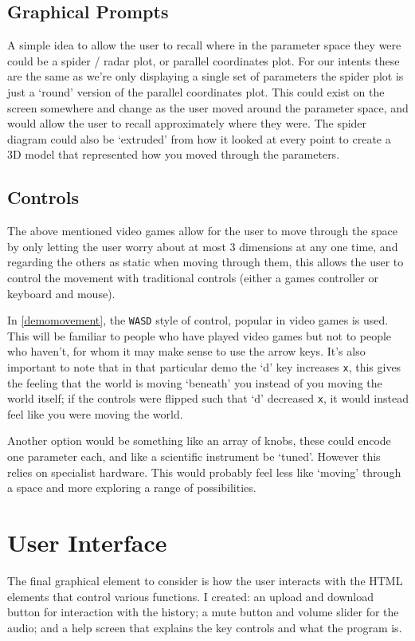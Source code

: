 \subsection{Graphical Prompts}
A simple idea to allow the user to recall where in the parameter space they were
could be a spider / radar plot, or parallel coordinates plot. For our intents these
are the same as we're only displaying a single set of parameters the spider plot
is just a `round' version of the parallel coordinates plot. This could exist on
the screen somewhere and change as the user moved around the parameter space,
and would allow the user to recall approximately where they were. The spider
diagram could also be `extruded' from how it looked at every point to create a
3D model that represented how you moved through the parameters.

\subsection{Controls}
The above mentioned video games allow for the user to move through the space by
only letting the user worry about at most 3 dimensions at any one time, and
regarding the others as static when moving through them, this allows the user to
control the movement with traditional controls (either a games controller or
keyboard and mouse).

In \autoref{demomovement}, the \verb|WASD| style of control, popular in video
games is used. This will be familiar to people who have played video games but
not to people who haven't, for whom it may make sense to use the arrow keys.
It's also important to note that in that particular demo the `d' key increases
\verb|x|, this gives the feeling that the world is moving `beneath' you instead
of you moving the world itself; if the controls were flipped such that `d'
decreased \verb|x|, it would instead feel like you were moving the world. 

Another option would be something like an array of knobs, these could encode one
parameter each, and like a scientific instrument be `tuned'. However this relies
on specialist hardware. This would probably feel less like `moving' through a
space and more exploring a range of possibilities.

\section{User Interface}
The final graphical element to consider is how the user interacts with the HTML
elements that control various functions. I created: an upload and download button
for interaction with the history; a mute button and volume slider for the audio;
and a help screen that explains the key controls and what the program is.

